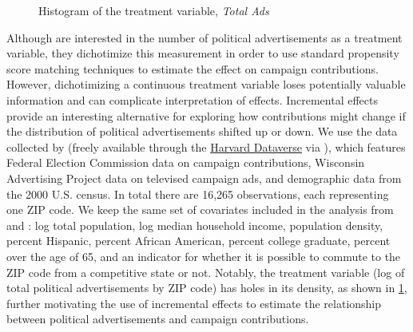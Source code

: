 \documentclass[11pt,twoside]{article}
\theoremstyle{definition}
\theoremstyle{remark}
\begin{document}
\begin{figure}[h]
\caption{Histogram of the treatment variable, \textit{Total Ads}}
\label{total_ads}
\end{figure}


Although \cite{urban2014dollars} are interested in the number of political advertisements as a treatment variable, they dichotimize this measurement in order to use standard propensity score matching techniques to estimate the effect on campaign contributions. However, dichotimizing a continuous treatment variable loses potentially valuable information and can complicate interpretation of effects. Incremental effects provide an interesting alternative for exploring how contributions might change if the distribution of political advertisements shifted up or down. We use the data collected by \cite{urban2014dollars} (freely available through the \href{https://dataverse.harvard.edu/dataset.xhtml?persistentId=doi:10.7910/DVN/AIF4PI}{Harvard Dataverse} via \cite{fong2018covariate}), which features Federal Election Commission data on campaign contributions, Wisconsin Advertising Project data on televised campaign ads, and demographic data from the 2000 U.S. census. In total there are 16,265 observations, each representing one ZIP code. We keep the same set of covariates included in the analysis from \cite{urban2014dollars} and \cite{fong2018covariate}: log total population, log median household income, population density, percent Hispanic, percent African American, percent college graduate, percent over the age of 65, and an indicator for whether  it is possible to commute to the ZIP code from a competitive state or not. Notably, the treatment variable (log of total political advertisements by ZIP code) has holes in its density, as shown in \cref{total_ads}, further motivating the use of incremental effects to estimate the relationship between political advertisements and campaign contributions.
\end{document}
